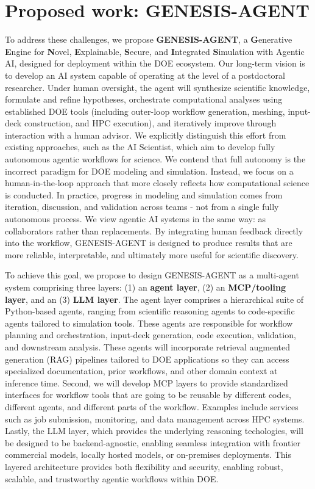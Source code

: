 \documentclass[11pt]{article} \usepackage[margin=1in]{geometry}
\begin{document}
\section*{Proposed work: GENESIS-AGENT}
To address these challenges, we propose \textbf{GENESIS-AGENT}, a
\textbf{G}enerative \textbf{E}ngine for \textbf{N}ovel, \textbf{E}xplainable,
\textbf{S}ecure, and \textbf{I}ntegrated \textbf{S}imulation with Agentic
AI, designed for deployment within the DOE ecosystem. Our long-term vision is
to develop an AI system capable of operating at the level of a postdoctoral
researcher. Under human oversight, the agent will synthesize scientific
knowledge, formulate and refine hypotheses, orchestrate computational analyses
using established DOE tools (including outer-loop workflow generation,
meshing, input-deck construction, and HPC execution), and iteratively improve
through interaction with a human advisor. We explicitly distinguish this effort from existing approaches, such as the
AI Scientist, which aim to develop fully autonomous agentic workflows for
science. We contend that full autonomy is the incorrect paradigm for DOE modeling and
simulation. Instead, we focus on a human-in-the-loop approach that more closely
reflects how computational science is conducted. In practice, progress in
modeling and simulation comes from iteration, discussion, and validation across
teams - not from a single fully autonomous process. We view agentic AI systems in
the same way: as collaborators rather than replacements. By integrating human
feedback directly into the workflow, GENESIS-AGENT is designed to produce
results that are more reliable, interpretable, and ultimately more useful for
scientific discovery.
  
To achieve this goal, we propose to design GENESIS-AGENT as a multi-agent
system comprising three layers: (1)
an \textbf{agent layer}, (2) an \textbf{MCP/tooling layer}, and an (3) \textbf{LLM
layer}. The agent layer comprises a hierarchical suite of Python-based agents, ranging
from scientific reasoning agents to code-specific agents tailored to simulation
tools. These agents are responsible for workflow planning and orchestration,
input-deck generation, code execution,
validation, and downstream analysis. These agents will incorporate retrieval augmented
generation (RAG) pipelines tailored to DOE applications so they can access
specialized documentation, prior workflows, and other domain context at
inference time. Second, we will develop MCP layers to provide
standardized interfaces for workflow tools that are going to be reusable by
different codes, different agents, and different parts of the workflow. Examples
include services such as job submission, monitoring, and data management across
HPC systems. Lastly, the LLM layer, which provides the underlying reasoning
techologies, will be designed to be backend-agnostic,
enabling seamless integration with frontier commercial models, locally hosted
models, or on-premises deployments. This layered architecture provides both
flexibility and security, enabling robust, scalable, and trustworthy agentic
workflows within DOE. 
\end{document}
